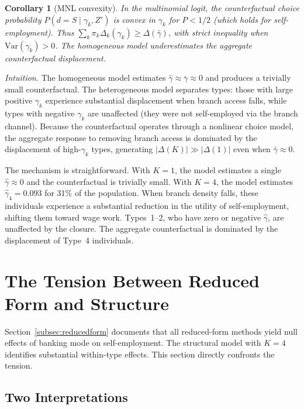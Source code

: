 \documentclass[12pt]{article}
\newtheorem{corollary}[proposition]{Corollary}
\begin{document}
\begin{corollary}[MNL convexity]
\label{cor:mnl_convexity}
In the multinomial logit, the counterfactual choice probability $P(d = S \mid \gamma_k, Z')$ is convex in $\gamma_k$ for $P < 1/2$ (which holds for self-employment). Thus $\sum_k \pi_k \Delta_k(\gamma_k) \geq \Delta(\bar{\gamma})$, with strict inequality when $\text{Var}(\gamma_k) > 0$. The homogeneous model underestimates the aggregate counterfactual displacement.
\end{corollary}

\noindent\textit{Intuition.} The homogeneous model estimates $\hat{\gamma} \approx \bar{\gamma} \approx 0$ and produces a trivially small counterfactual. The heterogeneous model separates types: those with large positive $\gamma_k$ experience substantial displacement when branch access falls, while types with negative $\gamma_k$ are unaffected (they were not self-employed via the branch channel). Because the counterfactual operates through a nonlinear choice model, the aggregate response to removing branch access is dominated by the displacement of high-$\gamma_k$ types, generating $|\Delta(K)| \gg |\Delta(1)|$ even when $\bar{\gamma} \approx 0$.

The mechanism is straightforward. With $K=1$, the model estimates a single $\hat{\gamma} \approx 0$ and the counterfactual is trivially small. With $K=4$, the model estimates $\hat{\gamma}_4 = 0.093$ for 31\% of the population. When branch density falls, these individuals experience a substantial reduction in the utility of self-employment, shifting them toward wage work. Types~1--2, who have zero or negative $\hat{\gamma}$, are unaffected by the closure. The aggregate counterfactual is dominated by the displacement of Type~4 individuals.


\section{The Tension Between Reduced Form and Structure}
\label{sec:tension}

Section~\ref{subsec:reducedform} documents that all reduced-form methods yield null effects of banking mode on self-employment. The structural model with $K=4$ identifies substantial within-type effects. This section directly confronts the tension.

\subsection{Two Interpretations}
\end{document}
